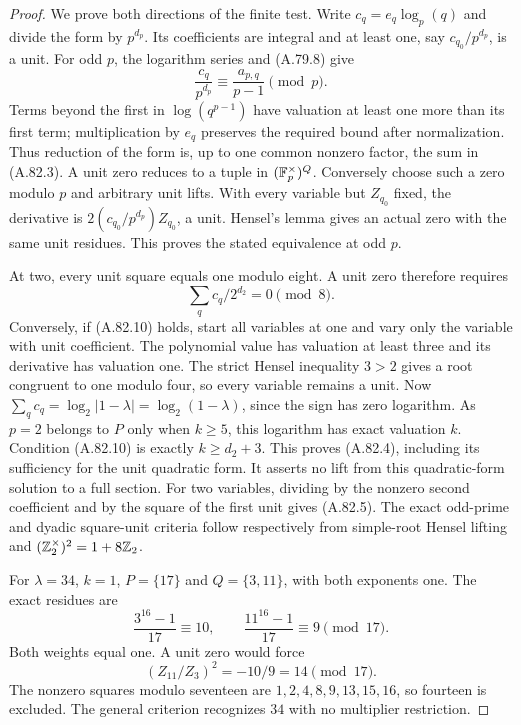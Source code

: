 \begin{proof}
We prove both directions of the finite test.
Write $c_q=e_q\log_p(q)$ and divide the form by
$p^{d_p}$.  Its coefficients are integral and at least
one, say $c_{q_0}/p^{d_p}$, is a unit.
For odd $p$, the logarithm series and (A.79.8) give
\[
 \frac{c_q}{p^{d_p}}
       \equiv\frac{a_{p,q}}{p-1}\pmod p.
\tag{A.82.9}
\]
Terms beyond the first in $\log(q^{p-1})$ have valuation
at least one more than its first term; multiplication
by $e_q$ preserves the required bound after normalization.
Thus reduction of the form is, up to one common nonzero
factor, the sum in (A.82.3).
A unit zero reduces to a tuple in $(\mathbb F_p^\times)^Q$.
Conversely choose such a zero modulo $p$ and arbitrary
unit lifts.  With every variable but $Z_{q_0}$ fixed,
the derivative is $2(c_{q_0}/p^{d_p})Z_{q_0}$, a unit.
Hensel's lemma gives an actual zero with the same unit
residues.  This proves the stated equivalence at odd $p$.

At two, every unit square equals one modulo eight.
A unit zero therefore requires
\[
                        \sum_q c_q/2^{d_2}=0\pmod8.
\tag{A.82.10}
\]
Conversely, if (A.82.10) holds, start all variables at one
and vary only the variable with unit coefficient.
The polynomial value has valuation at least three and
its derivative has valuation one.  The strict Hensel
inequality $3>2$ gives a root congruent to one modulo four,
so every variable remains a unit.
Now $\sum_q c_q=\log_2|1-\lambda|=\log_2(1-\lambda)$,
since the sign has zero logarithm.  As $p=2$ belongs to
$P$ only when $k\ge5$, this logarithm has exact valuation
$k$.  Condition (A.82.10) is exactly $k\ge d_2+3$.
This proves (A.82.4), including its sufficiency for the
unit quadratic form.  It asserts no lift from this
quadratic-form solution to a full section.
For two variables, dividing by the nonzero second
coefficient and by the square of the first unit gives
(A.82.5).  The exact odd-prime and dyadic square-unit
criteria follow respectively from simple-root Hensel
lifting and $(\mathbb Z_2^\times)^2=1+8\mathbb Z_2$.

For $\lambda=34$, $k=1$, $P=\{17\}$ and
$Q=\{3,11\}$, with both exponents one.
The exact residues are
\[
 \frac{3^{16}-1}{17}\equiv10,\qquad
 \frac{11^{16}-1}{17}\equiv9\pmod{17}.
\tag{A.82.11}
\]
Both weights equal one.  A unit zero would force
\[
                       (Z_{11}/Z_3)^2
                               =-10/9=14\pmod{17}.
\tag{A.82.12}
\]
The nonzero squares modulo seventeen are
$1,2,4,8,9,13,15,16$, so fourteen is excluded.
The general criterion recognizes $34$ with no multiplier
restriction.


\end{proof}
